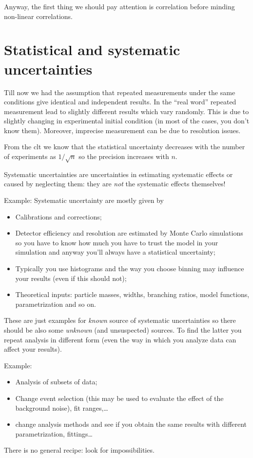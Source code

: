 Anyway, the first thing we should pay attention is correlation before minding non-linear correlations.

\section{Statistical and systematic uncertainties}

Till now we had the assumption that repeated measurements under the same conditions give identical and independent results.
In the ``real word'' repeated measurement lead to slightly different results which vary randomly.
This is due to slightly changing in experimental initial condition (in most of the cases, you don't know them).
Moreover, imprecise measurement can be due to resolution issues.


From the \ac{clt} we know that the statistical uncertainty decreases with the number of experiments as $1/\sqrt{n}$ so the precision increases with $n$.


Systematic uncertainties are uncertainties in estimating systematic effects or caused by neglecting them: they are \emph{not} the systematic effects themselves!


Example: Systematic uncertainty are mostly given by

\begin{itemize}
	\item
		Calibrations and corrections;
	\item
		Detector efficiency and resolution are estimated by Monte Carlo simulations so you have to know how much you have to trust the model in your simulation and anyway you'll always have a statistical uncertainty;
	\item
		Typically you use histograms and the way you choose binning may influence your results (even if this should not);
	\item
		Theoretical inputs: particle masses, widths, branching ratios, model functions, parametrization and so on.
\end{itemize}

These are just examples for \emph{known} source of systematic uncertainties so there should be also some \emph{unknown} (and unsuspected) sources.
To find the latter you repeat analysis in different form (even the way in which you analyze data can affect your results).

Example:
\begin{itemize}
	\item
		Analysis of subsets of data;
	\item
		Change event selection (this may be used to evaluate the effect of the background noise), fit ranges,\dots{}
	\item
		change analysis methods and see if you obtain the same results with different parametrization,  fittings\dots
\end{itemize}
There is no general recipe: look for impossibilities.



